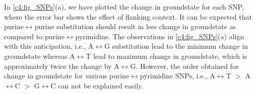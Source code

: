 


  
In \cref{c4:fig_SNPs}(a), we have plotted the change in groundstate for each SNP, where the error bar shows the effect of flanking context.
It can be expected that purine$\longleftrightarrow$purine substitution should result in less change in groundstate as compared to  purine$\longleftrightarrow$pyrimidine.
The observations in \cref{c4:fig_SNPs}(a) align with this anticipation, i.e., A$\longleftrightarrow$G substitution lead to the minimum change in groundstate whereas A$\longleftrightarrow$T lead to maximum change in groundstate, which is approximately twice the change by A$\longleftrightarrow$G.
However, the order obtained for change in groundstate for various purine$\longleftrightarrow$pyrimidine SNPs, i.e., A$\longleftrightarrow$T $>$ A$\longleftrightarrow$C $>$ G$\longleftrightarrow$C can not be explained easily.

